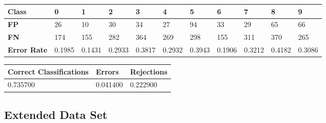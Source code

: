 \documentclass[
  a4paper,            %
  DIV=10,             %
  oneside,            %
  BCOR=5mm,           %
  parskip=half,       %
  numbers=noenddot,   %
  bibtotoc,           %
  listof=totoc,        %
  article
]{scrreprt}
\begin{document}
\begin{center}
  \begin{tabular}{|p{1cm}|p{1cm}|p{1cm}|p{1cm}|p{1cm}|p{1cm}|p{1cm}|p{1cm}|p{1cm}|p{1cm}|p{1cm}|}
    \hline
    \textbf{Class} & \textbf{0} & \textbf{1} & \textbf{2} & \textbf{3} & \textbf{4} & \textbf{5} & \textbf{6} & \textbf{7} & \textbf{8} & \textbf{9} \\
    \hline
    \textbf{FP} & 26 & 10 & 30 & 34 & 27 & 94 & 33 & 29 & 65 & 66 \\
    \hline
    \textbf{FN} & 174 & 155 & 282 & 364 & 269 & 298 & 155 & 311 & 370 & 265 \\
    \hline
    \textbf{Error Rate} & 0.1985 & 0.1431 & 0.2933 & 0.3817 & 0.2932 & 0.3943 & 0.1906 & 0.3212 & 0.4182 & 0.3086 \\
    \hline
  \end{tabular}
\end{center}

\begin{center}
  \begin{tabular}{|p{5cm}|p{3cm}|p{3cm}|}
    \hline
    \textbf{Correct Classifications} & \textbf{Errors} & \textbf{Rejections} \\
    \hline
    0.735700 & 0.041400 & 0.222900 \\
    \hline
  \end{tabular}
\end{center}
\subsection{Extended Data Set}
\end{document}
